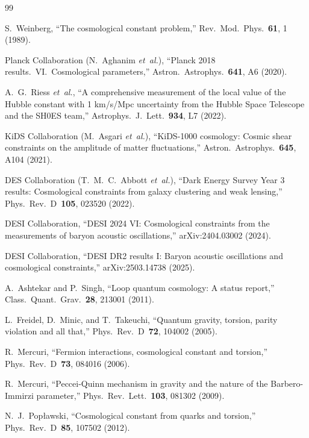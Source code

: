 \documentclass[aps,prd,twocolumn,superscriptaddress,showpacs,preprintnumbers,
  nofootinbib,longbibliography,floatfix]{revtex4-2}
\newcommand{\etal}{\textit{et~al.}}
\begin{document}
\begin{thebibliography}{99}

S.~Weinberg,
``The cosmological constant problem,''
Rev.\ Mod.\ Phys.\ \textbf{61}, 1 (1989).

Planck Collaboration (N.~Aghanim \etal),
``Planck 2018 results.\ VI.\ Cosmological parameters,''
Astron.\ Astrophys.\ \textbf{641}, A6 (2020).

A.~G.~Riess \etal,
``A comprehensive measurement of the local value of the Hubble constant
with 1 km/s/Mpc uncertainty from the Hubble Space Telescope and the
SH0ES team,''
Astrophys.\ J.\ Lett.\ \textbf{934}, L7 (2022).

KiDS Collaboration (M.~Asgari \etal),
``KiDS-1000 cosmology: Cosmic shear constraints on the amplitude of
matter fluctuations,''
Astron.\ Astrophys.\ \textbf{645}, A104 (2021).

DES Collaboration (T.~M.~C.~Abbott \etal),
``Dark Energy Survey Year 3 results: Cosmological constraints from
galaxy clustering and weak lensing,''
Phys.\ Rev.\ D~\textbf{105}, 023520 (2022).

DESI Collaboration,
``DESI 2024 VI: Cosmological constraints from the measurements of
baryon acoustic oscillations,''
arXiv:2404.03002 (2024).

DESI Collaboration,
``DESI DR2 results I: Baryon acoustic oscillations and cosmological
constraints,''
arXiv:2503.14738 (2025).

A.~Ashtekar and P.~Singh,
``Loop quantum cosmology: A status report,''
Class.\ Quant.\ Grav.\ \textbf{28}, 213001 (2011).

L.~Freidel, D.~Minic, and T.~Takeuchi,
``Quantum gravity, torsion, parity violation and all that,''
Phys.\ Rev.\ D~\textbf{72}, 104002 (2005).

R.~Mercuri,
``Fermion interactions, cosmological constant and torsion,''
Phys.\ Rev.\ D~\textbf{73}, 084016 (2006).

R.~Mercuri,
``Peccei-Quinn mechanism in gravity and the nature of the
Barbero-Immirzi parameter,''
Phys.\ Rev.\ Lett.\ \textbf{103}, 081302 (2009).

N.~J.~Pop\l{}awski,
``Cosmological constant from quarks and torsion,''
Phys.\ Rev.\ D~\textbf{85}, 107502 (2012).


\end{thebibliography}
\end{document}
